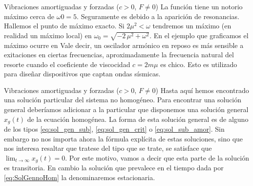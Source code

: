 \documentclass[handout,hyperref={colorlinks=true}]{beamer}
\renewcommand{\emph}[1]{\textcolor[rgb]{1,0,0}{#1}}
\begin{document}
 \begin{frame}{ Vibraciones amortiguadas y forzadas ($c>0$, $F\neq 0$) } 
La función tiene un notorio máximo  cerca de $\omega0=5$. Seguramente es debido a la aparición de resonancias. Hallemos el punto de máximo exacto. 
\lstI
Si $2\mu^2<\omega$ tendremos un máximo (en realidad un máximo local) en  $\omega_{0} = \sqrt{-2 \, \mu^{2} + \omega^{2}}$. En el ejemplo que graficamos
el máximo ocurre en
\lstII
Vale decir, un oscilador armónico en reposo es más sensible a exitaciones en ciertas frecuencias, aproximadamente la frecuencia
natural del resorte cuando el coeficiente de viscocidad $c=2m\mu$ es chico. Esto es utilizado para diseñar dispositivos que captan ondas sísmicas.


\end{frame}

 \begin{frame}{ Vibraciones amortiguadas y forzadas ($c>0$, $F\neq 0$) } 
 Hasta aquí hemos encontrado una solución particular del sistema no homogéneo. Para encontrar una solución general deberíamos adicionar a la particular que disponemos
 una solución general $x_g(t)$  de la ecuación homogénea.  La forma de esta solución general es de alguno de los tipos \ref{eq:sol_gen_sub},
 \ref{eq:sol_gen_crit} o \ref{eq:sol_sub_amor}. Sin embargo no nos importa ahora la fórmula explícita de estas soluciones, sino que nos interesa resaltar que 
 tratese del tipo que se trate, se satisface que $\lim_{t\to\infty}x_g(t)=0$. Por este motivo, vamos a decir que esta parte de la solución es 
 \emph{transitoria}. En cambio la solución que prevalece en el tiempo dada por \eqref{eq:SolGennoHom} la denominaremos \emph{estacionaria}.
  
\end{frame}
 
 
\end{document}
